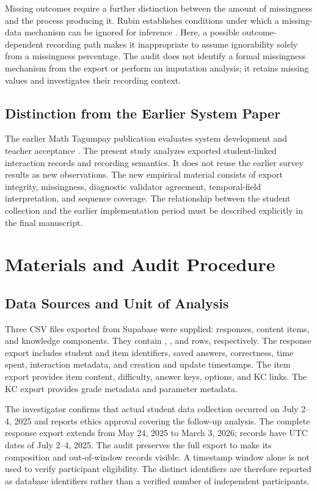 \documentclass[conference]{IEEEtran}
\newif\ifworkingdraft
\newcommand{\draftnote}[1]{\ifworkingdraft\par\noindent\textcolor{red}{\textbf{Author review:} #1}\par\fi}
\begin{document}
Missing outcomes require a further distinction between the amount of missingness and the process producing it. Rubin establishes conditions under which a missing-data mechanism can be ignored for inference \cite{rubin1976}. Here, a possible outcome-dependent recording path makes it inappropriate to assume ignorability solely from a missingness percentage. The audit does not identify a formal missingness mechanism from the export or perform an imputation analysis; it retains missing values and investigates their recording context.

\subsection{Distinction from the Earlier System Paper}
The earlier Math Tagumpay publication evaluates system development and teacher acceptance \cite{ruiz2026}. The present study analyzes exported student-linked interaction records and recording semantics. It does not reuse the earlier survey results as new observations. The new empirical material consists of export integrity, missingness, diagnostic validator agreement, temporal-field interpretation, and sequence coverage. The relationship between the student collection and the earlier implementation period must be described explicitly in the final manuscript.
\draftnote{Confirm the exact relationship between the July student collection and the earlier teacher evaluation, including whether any interaction-log results have already appeared in another publication.}

\section{Materials and Audit Procedure}
\subsection{Data Sources and Unit of Analysis}
Three CSV files exported from Supabase were supplied: responses, content items, and knowledge components. They contain \ResponseCount{}, \CatalogItemCount{}, and \CatalogKCCount{} rows, respectively. The response export includes student and item identifiers, saved answers, correctness, time spent, interaction metadata, and creation and update timestamps. The item export provides item content, difficulty, answer keys, options, and KC links. The KC export provides grade metadata and parameter metadata.

The investigator confirms that actual student data collection occurred on July 2--4, 2025 and reports ethics approval covering the follow-up analysis. The complete response export extends from May 24, 2025 to March 3, 2026; \DayWindowRows{} records have UTC dates of July 2--4, 2025. The audit preserves the full export to make its composition and out-of-window records visible. A timestamp window alone is not used to verify participant eligibility. The \StudentIDCount{} distinct identifiers are therefore reported as database identifiers rather than a verified number of independent participants.
\end{document}
